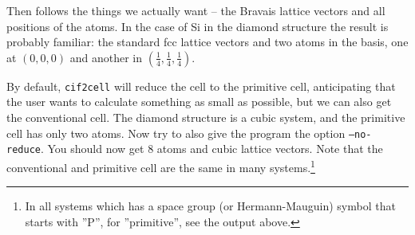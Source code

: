 \documentclass[11pt]{article}
\newcommand{\ciftocell}{\texttt{cif2cell}}
\begin{document}
Then follows the things we actually want -- the Bravais lattice vectors and all positions of the atoms.  In the case of Si in the diamond structure the result is probably familiar:  the standard fcc lattice vectors and two atoms in the basis, one at $(0,0,0)$ and another in $(\frac{1}{4},\frac{1}{4},\frac{1}{4})$. 

By default, \ciftocell{} will reduce the cell to the primitive cell, anticipating that the user wants to calculate something as small as possible, but we can also get the conventional cell. The diamond structure is a cubic system, and the primitive cell has only two atoms. Now try to also give the program the option \texttt{--no-reduce}. You should now get 8 atoms and cubic lattice vectors. Note that the conventional and primitive cell are the same in many systems.\footnote{In all systems which has a space group (or Hermann-Mauguin) symbol that starts with ''P'', for ''primitive'', see the output above.}
\end{document}
